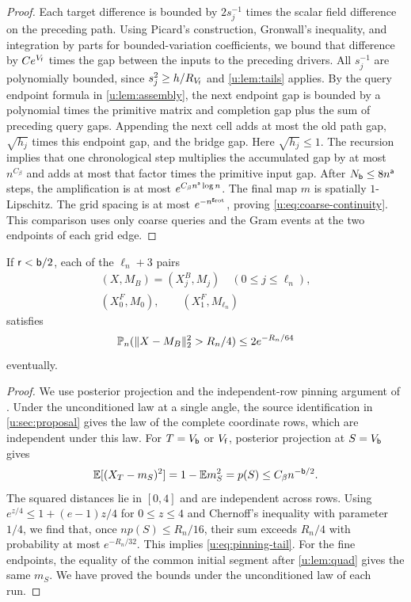 \begin{proof}
Each target difference is bounded by $2s_j^{-1}$ times the scalar field
difference on the preceding path. Using Picard's construction, Gronwall's inequality, and integration by
parts for bounded-variation coefficients, we bound that difference by
$Ce^{V_{\mathsf{f}}}$ times the gap between the inputs to the preceding drivers. All $s_j^{-1}$ are polynomially bounded, since
$s_j^2\ge h/R_{V_{\mathsf{f}}}$ and \cref{u:lem:tails} applies. By the query
endpoint formula in \cref{u:lem:assembly}, the next endpoint gap is bounded
by a polynomial times the primitive matrix and completion gap plus the
sum of preceding query gaps. Appending the next cell adds at most the
old path gap, $\sqrt{h_j}$ times this endpoint gap, and the bridge gap.
Here $\sqrt{h_j}\le1$. The recursion implies that one chronological step multiplies the accumulated gap by
at most $n^{C_\beta}$ and adds at most that factor times the primitive
input gap. After $N_{\mathsf{b}}\le8n^{\mathsf{a}}$ steps, the
amplification is at most $e^{C_\beta n^{\mathsf{a}}\log n}$.
The final map $m$ is spatially $1$-Lipschitz. The grid spacing is at most
$e^{-n^{\mathsf{g}_{\rm rot}}}$, proving \eqref{u:eq:coarse-continuity}.
This comparison uses only coarse queries and the Gram events at the
two endpoints of each grid edge.
\end{proof}

\begin{lemma}\label{u:lem:pinning}
If $\mathsf{r}<\mathsf{b}/2$, each of the $\ell_n+3$ pairs
\[
 \begin{gathered}
 (X,M_B)=(X_j^B,M_j)\quad(0\le j\le\ell_n),\\
 (X_0^F,M_0),\qquad (X_1^F,M_{\ell_n})
 \end{gathered}
\]
satisfies
\begin{equation}\label{u:eq:pinning-tail}
 \mathbb P_n(\|X-M_B\|_2^2>R_n/4)\le2e^{-R_n/64}
\end{equation}
eventually.
\end{lemma}

\begin{proof}
We use posterior projection and the independent-row pinning argument of
\cite[Section~6, proof of Proposition~7]{oai-typical-upper}.
Under the unconditioned law at a single angle, the source identification
in \cref{u:sec:proposal} gives the law of the complete coordinate rows,
which are independent under this law.
For $T=V_{\mathsf{b}}$ or $V_{\mathsf{f}}$, posterior projection at $S=V_{\mathsf{b}}$ gives
\[
 \mathbb E[(X_T-m_S)^2]=1-\mathbb E m_S^2=p(S)\le C_\beta n^{-\mathsf{b}/2}.
\]
The squared distances lie in $[0,4]$ and are independent across rows.
Using $e^{z/4}\le1+(e-1)z/4$ for $0\le z\le4$ and Chernoff's inequality
with parameter $1/4$, we find that, once $np(S)\le R_n/16$, their sum
exceeds $R_n/4$ with probability at most $e^{-R_n/32}$. This implies \eqref{u:eq:pinning-tail}.
For the fine endpoints, the equality of the common initial segment after
\cref{u:lem:quad} gives the same $m_S$. We have proved the bounds under the unconditioned law of each run.
\end{proof}

